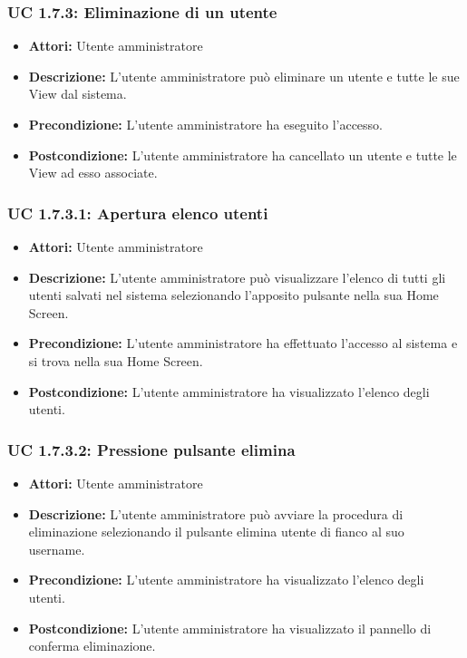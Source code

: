 \subsubsection{UC 1.7.3: Eliminazione di un utente}

\begin{itemize}
\item \textbf{Attori:} Utente amministratore
\item \textbf{Descrizione:} L'utente amministratore può eliminare un utente e tutte le sue View dal sistema.
\item \textbf{Precondizione:} L'utente amministratore ha eseguito l'accesso.
\item \textbf{Postcondizione:} L'utente amministratore ha cancellato un utente e tutte le View ad esso associate.
\end{itemize}

\subsubsection{UC 1.7.3.1: Apertura elenco utenti}

\begin{itemize}
\item \textbf{Attori:} Utente amministratore
\item \textbf{Descrizione:} L'utente amministratore può visualizzare l'elenco di tutti gli utenti salvati nel sistema selezionando l'apposito pulsante nella sua Home Screen.
\item \textbf{Precondizione:} L'utente amministratore ha effettuato l'accesso al sistema e si trova nella sua Home Screen.
\item \textbf{Postcondizione:} L'utente amministratore ha visualizzato l'elenco degli utenti.
\end{itemize}

\subsubsection{UC 1.7.3.2: Pressione pulsante elimina}

\begin{itemize}
\item \textbf{Attori:} Utente amministratore
\item \textbf{Descrizione:} L'utente amministratore può avviare la procedura di eliminazione selezionando il pulsante elimina utente di fianco al suo username.
\item \textbf{Precondizione:} L'utente amministratore ha visualizzato l'elenco degli utenti.
\item \textbf{Postcondizione:} L'utente amministratore ha visualizzato il pannello di conferma eliminazione.
\end{itemize}

